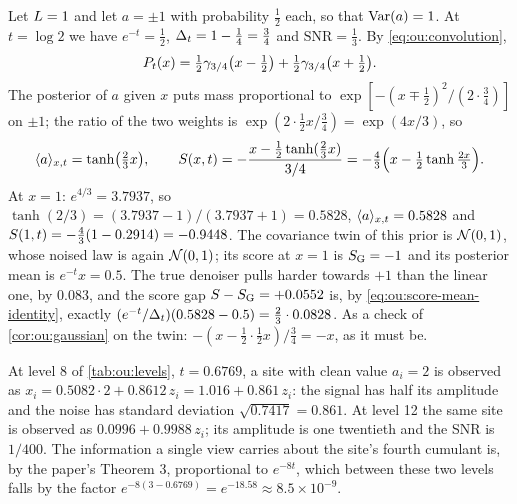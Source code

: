 \begin{example}[A two-point prior at $t=\log2$]
\label{ex:ou:twopoint}
Let $L=1$ and let $a=\pm1$ with probability $\tfrac12$ each, so that
$\operatorname{Var}(a)=1$. At $t=\log2$ we have $e^{-t}=\tfrac12$, $\Delta_t=1-\tfrac14=\tfrac34$ and
$\mathrm{SNR}=\tfrac13$. By \cref{eq:ou:convolution},
\[
  P_t(x)=\tfrac12\gamma_{3/4}\bigl(x-\tfrac12\bigr)+\tfrac12\gamma_{3/4}\bigl(x+\tfrac12\bigr).
\]
The posterior of $a$ given $x$ puts mass proportional to $\exp[-(x\mp\tfrac12)^2/(2\cdot\tfrac34)]$
on $\pm1$; the ratio of the two weights is $\exp(2\cdot\tfrac12x/\tfrac34)=\exp(4x/3)$, so
\[
  \langle a \rangle_{x,t}=\tanh\bigl(\tfrac23x\bigr),\qquad
  S(x,t)=-\frac{x-\tfrac12\tanh(\tfrac23x)}{3/4}=-\tfrac43\Bigl(x-\tfrac12\tanh\tfrac{2x}{3}\Bigr).
\]
At $x=1$: $e^{4/3}=3.7937$, so $\tanh(2/3)=(3.7937-1)/(3.7937+1)=0.5828$,
$\langle a \rangle_{x,t}=0.5828$ and $S(1,t)=-\tfrac43(1-0.2914)=-0.9448$. The covariance twin
of this prior is $\mathcal{N}\!\left(0,1\right)$, whose noised law is again $\mathcal{N}\!\left(0,1\right)$; its score at $x=1$
is $S_{\mathrm{G}}=-1$ and its posterior mean is $e^{-t}x=0.5$. The true denoiser pulls
harder towards $+1$ than the linear one, by $0.083$, and the score gap
$S-S_{\mathrm{G}}=+0.0552$ is, by \cref{eq:ou:score-mean-identity}, exactly
$(e^{-t}/\Delta_t)(0.5828-0.5)=\tfrac23\cdot0.0828$. As a check of \cref{cor:ou:gaussian}
on the twin: $-(x-\tfrac12\cdot\tfrac12x)/\tfrac34=-x$, as it must be.
\end{example}

\begin{example}
\label{ex:ou:schedule}
At level 8 of \cref{tab:ou:levels}, $t=0.6769$, a site with clean value $a_i=2$ is
observed as $x_i=0.5082\cdot2+0.8612\,z_i=1.016+0.861\,z_i$: the signal has half its
amplitude and the noise has standard deviation $\sqrt{0.7417}=0.861$. At level 12 the
same site is observed as $0.0996+0.9988\,z_i$; its amplitude is one twentieth and the
SNR is $1/400$. The information a single view carries about the site's fourth
cumulant is, by the paper's Theorem 3, proportional to $e^{-8t}$, which between these
two levels falls by the factor $e^{-8(3-0.6769)}=e^{-18.58}\approx8.5\times10^{-9}$.
\end{example}


